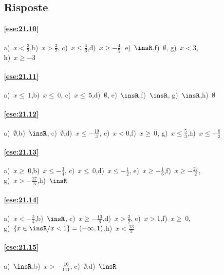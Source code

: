 \subsection{Risposte}

\begin{multicols}{2}
 \paragraph{\ref{ese:21.10}} a)~$x<\frac{3}{2}$,\quad b)~$x>\frac{3}{2}$,\quad
c)~$x\le \frac{4}{3}$,\quad d)~$x\ge -{\frac{4}{5}}$,\quad
e)~$\insR$,\quad f)~$\emptyset $,\quad
g)~$x<3$,\quad \protect\\ h)~$x\ge -3$

\paragraph{\ref{ese:21.11}} a)~$x\le~1$,\quad b)~$x\le~0$,\quad
c)~$x\le~5$,\quad d)~$\emptyset $,\quad
e)~$\insR$,\quad f)~$\insR$,\quad
g)~$\insR $,\quad h)~$\emptyset $

\paragraph{\ref{ese:21.12}} a)~$\emptyset $,\quad b)~$\insR$,\quad
c)~$\emptyset $,\quad d)~$x\le -{\frac{10}{3}}$,\quad
e)~$x<0$,\quad f)~$x\ge~0$,\quad
g)~$x\le \frac{5}{3}$,\quad h)~$x\le -{\frac{8}{3}}$

\paragraph{\ref{ese:21.13}} a)~$x\ge~0$,\quad b)~$x\le -{\frac{3}{4}}$,\quad
c)~$x\le~0$,\quad d)~$x\le -{\frac{1}{2}}$,\quad
e)~$x\ge -{\frac{1}{6}}$,\quad f)~$x\ge -{\frac{27}{2}}$,\quad
\protect\\g)~$x>-{\frac{27}{5}}$,\quad h)~$\insR$

\paragraph{\ref{ese:21.14}} a)~$x<-{\frac{3}{4}}$,\quad b)~$\insR$,\quad
c)~$x\ge -{\frac{13}{6}}$,\quad d)~$x>\frac{3}{2}$,\quad
e)~$x>1$,\quad f)~$x\ge~0$,\quad\protect\\
g)~$\{x\in\insR/x<1\}=(-\infty,1)$,\quad h)~$x<\frac{13}{2}$

\paragraph{\ref{ese:21.15}} a)~$\insR$,\quad b)~$x>-{\frac{10}{111}}$,\quad
c)~$\emptyset $,\quad d)~$\insR$


\end{multicols}
